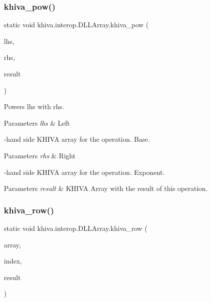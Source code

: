 \subsubsection{\texorpdfstring{khiva\+\_\+pow()}{khiva\_pow()}}
{\footnotesize\ttfamily static void khiva.\+interop.\+D\+L\+L\+Array.\+khiva\+\_\+pow (\begin{DoxyParamCaption}\item[{\mbox{[}\+In\mbox{]} ref Int\+Ptr}]{lhs,  }\item[{\mbox{[}\+In\mbox{]} ref Int\+Ptr}]{rhs,  }\item[{\mbox{[}\+Out\mbox{]} out Int\+Ptr}]{result }\end{DoxyParamCaption})\hspace{0.3cm}{\ttfamily [static]}}



Powers lhs with rhs.


\begin{DoxyParams}{Parameters}
{\em lhs} & Left\\
\hline
\end{DoxyParams}
-\/hand side K\+H\+I\+VA array for the operation. Base. 
\begin{DoxyParams}{Parameters}
{\em rhs} & Right\\
\hline
\end{DoxyParams}
-\/hand side K\+H\+I\+VA array for the operation. Exponent. 
\begin{DoxyParams}{Parameters}
{\em result} & K\+H\+I\+VA Array with the result of this operation.\\
\hline
\end{DoxyParams}
\mbox{\label{classkhiva_1_1interop_1_1_d_l_l_array_a62afacf313648e9cf65d3c93e0dcae3e}} 
\subsubsection{\texorpdfstring{khiva\+\_\+row()}{khiva\_row()}}
{\footnotesize\ttfamily static void khiva.\+interop.\+D\+L\+L\+Array.\+khiva\+\_\+row (\begin{DoxyParamCaption}\item[{\mbox{[}\+In\mbox{]} ref Int\+Ptr}]{array,  }\item[{\mbox{[}\+In\mbox{]} ref int}]{index,  }\item[{\mbox{[}\+Out\mbox{]} out Int\+Ptr}]{result }\end{DoxyParamCaption})\hspace{0.3cm}{\ttfamily [static]}}



